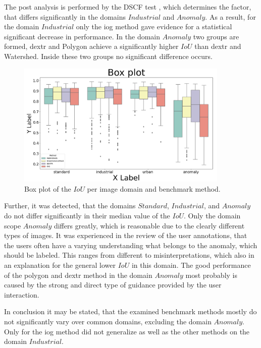 The post analysis is performed by the DSCF test \cite{CF91-dscf}, which determines the factor, that differs significantly in the domains $ Industrial $ and $ Anomaly $.
As a result, for the domain $ Industrial $ only the \gls{iog} method gave evidence for a statistical significant decrease in performance.
In the domain $ Anomaly $ two groups are formed, \gls{dextr} and Polygon achieve a significantly higher $ IoU $ than \gls{dextr} and Watershed.
Inside these two groups no significant difference occurs.
\begin{figure}
	\centering
	\includegraphics[width=0.9\textwidth]{figures/chap52_boxplot.png}
	\caption[Box plot IoU per domain and method]{
		Box plot of the $IoU$ per image domain and benchmark method.
	} \label{fig:ch5:sec2:domains_box_plot}
\end{figure}

Further, it was detected, that the domains $ Standard $, $ Industrial $, and $ Anomaly $ do not differ significantly in their median value of the $IoU$.
Only the domain scope $ Anomaly $ differs greatly, which is reasonable due to the clearly different types of images.
It was experienced in the review of the user annotations, that the users often have a varying understanding what belongs to the anomaly, which should be labeled.
This ranges from different to misinterpretations, which also in an explanation for the general lower $ IoU $ in this domain.
The good performance of the polygon and \gls{dextr} method in the domain $ Anomaly $ most probably is caused by the strong and direct type of guidance provided by the user interaction.

In conclusion it may be stated, that the examined benchmark methods mostly do not significantly vary over common domains, excluding the domain $ Anomaly $.
Only for the \gls{iog} method did not generalize as well as the other methods on the domain $ Industrial $.


